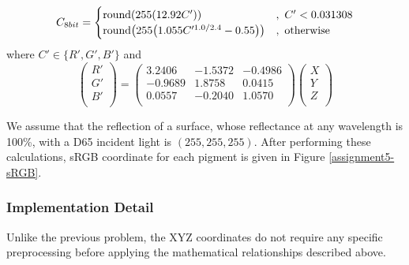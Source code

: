 \begin{equation}
    C_{8bit} = \begin{cases}
    \text{round}\parens*{255(12.92C')} &,~ C' < 0.031308 \\
    \text{round}\parens*{255\parens*{1.055C'^{1.0/2.4} - 0.55}} &,~ \text{otherwise}
    \end{cases}
\end{equation}
where $C' \in \{R', G', B'\}$ and
\begin{equation}
    \begin{pmatrix}
        R' \\
        G' \\
        B' \\
    \end{pmatrix} = 
    \begin{pmatrix}
        3.2406 &    -1.5372 &   -0.4986 \\
        -0.9689 &    1.8758 &   0.0415 \\
        0.0557 &    -0.2040 &   1.0570 \\
    \end{pmatrix}
    \begin{pmatrix}
        X \\
        Y \\
        Z \\
    \end{pmatrix}
\end{equation}
    
We assume that the reflection of a surface, whose reflectance at any wavelength is 100\%, with a D65 incident light is $(255,255,255)$. After performing these calculations, sRGB coordinate for each pigment is given in Figure \ref{assignment5-sRGB}.

\subsubsection{Implementation Detail}
Unlike the previous problem, the XYZ coordinates do not require any specific preprocessing before applying the mathematical relationships described above.

